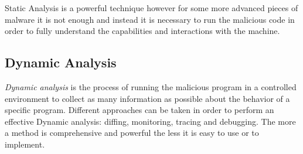 Static Analysis is a powerful technique however for some more advanced pieces of malware it is not enough and instead it is necessary to run the malicious code in order to fully understand the capabilities and interactions with the machine.

\subsection*{Dynamic Analysis}


\textit{Dynamic analysis} is the process of running the malicious program in a controlled environment to collect as many information as possible about the behavior of a specific program. Different approaches can be taken in order to perform an effective Dynamic analysis: diffing, monitoring, tracing and debugging. The more a method is comprehensive and powerful the less it is easy to use or to implement.

